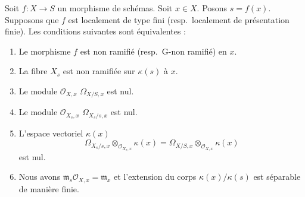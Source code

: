 \begin{lemma}
\label{lemma-unramified-at-point}
Soit $f : X \to S$ un morphisme de schémas. Soit $x \in X$.
Posons $s = f(x)$.
Supposons que $f$
est localement de type fini (resp.\ localement de présentation finie). Les conditions
suivantes sont équivalentes :
\begin{enumerate}
\item Le morphisme $f$ est non ramifié (resp.\ G-non ramifié) en $x$.
\item La fibre $X_s$ est non ramifiée sur $\kappa(s)$ à $x$.
\item Le module $\mathcal{O}_{X, x}$ $\Omega_{X/S, x}$ est nul.
\item Le module $\mathcal{O}_{X_s, x}$ $\Omega_{X_s/s, x}$ est nul.
\item L'espace vectoriel $\kappa(x)$
$$
\Omega_{X_s/s, x} \otimes_{\mathcal{O}_{X_s, x}} \kappa(x) =
\Omega_{X/S, x} \otimes_{\mathcal{O}_{X, x}} \kappa(x)
$$
est nul.
\item Nous avons $\mathfrak m_s\mathcal{O}_{X, x} = \mathfrak m_x$ et l'extension du corps
$\kappa(x)/\kappa(s)$ est séparable de manière
finie.
\end{enumerate}
\end{lemma}

